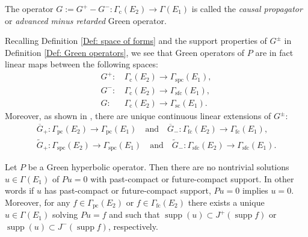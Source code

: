 \begin{Definition}
	The operator $G:=G^+-G^-:\Gamma_\mathrm{c}(E_2)\to \Gamma(E_1)$ is called the \emph{causal propagator} or \emph{advanced minus retarded} Green operator.
\end{Definition}

\begin{remark}\label{Rmk: Extensions of Green operators}
	Recalling Definition \ref{Def: space of forms} and the support properties of $G^\pm$ in Definition \ref{Def: Green operators}, we see that Green operators of $P$ are in fact linear maps between the following spaces:
	\begin{align}
		G^+:\,&\Gamma_\mathrm{c}(E_2)\to \Gamma_\mathrm{spc}(E_1),\\
		G^-:\,&\Gamma_\mathrm{c}(E_2)\to \Gamma_\mathrm{sfc}(E_1),\\
		G:\,&\Gamma_\mathrm{c}(E_2)\to \Gamma_\mathrm{sc}(E_1).
	\end{align}
	Moreover, as shown in \cite[Thm. 3.8, Cor. 3.10, 3.11]{Baer-15}, there are unique continuous linear extensions of $G^\pm$:
	\begin{align}
		\overline{G}_+:\Gamma_\mathrm{pc}(E_2)\to \Gamma_\mathrm{pc}(E_1)\quad\text{and}\quad \overline{G}_-:\Gamma_\mathrm{fc}(E_2)\to \Gamma_\mathrm{fc}(E_1),\\
		\widetilde{G}_+:\Gamma_\mathrm{spc}(E_2)\to \Gamma_\mathrm{spc}(E_1)\quad\text{and}\quad \widetilde{G}_-:\Gamma_\mathrm{sfc}(E_2)\to \Gamma_\mathrm{sfc}(E_1).
	\end{align}
\end{remark}

\begin{proposition}\label{Prop: Solutions with Green operators}
	Let $P$ be a Green hyperbolic operator. Then there are no nontrivial solutions $u\in \Gamma(E_1)$ of $Pu=0$ with past-compact or future-compact support. In other words if $u$ has past-compact or future-compact support, $Pu=0$ implies $u=0$.\\ Moreover, for any $f\in \Gamma_{\mathrm{pc}}(E_2)$ or $f\in \Gamma_{\mathrm{fc}}(E_2)$ there exists a unique $u\in \Gamma(E_1)$ solving $Pu=f$ and such that $\operatorname{supp}(u)\subset J^+(\operatorname{supp}f)$ or $\operatorname{supp}(u)\subset J^-(\operatorname{supp}f)$, respectively.
\end{proposition}

